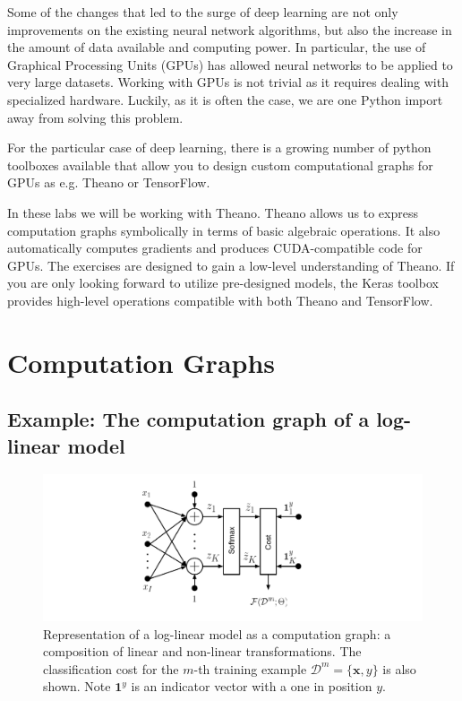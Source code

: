 Some of the changes that led to the surge of deep learning are not only
improvements on the existing neural network algorithms, but also
the increase in the amount of data available and computing power. In
particular, the use of Graphical Processing Units (GPUs) has allowed neural
networks to be applied to very large datasets. Working with GPUs is not trivial
as it requires dealing with specialized hardware. Luckily, as it is often the
case, we are one Python import away from solving this problem. 

For the particular case of deep learning, there is a growing number of python
toolboxes available that allow you to design custom computational graphs for
GPUs as e.g.
Theano\footnotemark{} or TensorFlow\footnotemark{}.

In these labs we will be working with Theano. Theano allows us to express
computation graphs symbolically in terms of basic algebraic operations. It also
automatically computes gradients and produces CUDA-compatible code for GPUs. The
exercises are designed to gain a low-level understanding of Theano. If you are
only looking forward to utilize pre-designed models, the Keras
toolbox\footnotemark{} provides high-level
operations compatible with both Theano and TensorFlow. 

\section{Computation Graphs} 

\subsection{Example: The computation graph of a log-linear model}

\begin{figure}[!h]
\centering
\includegraphics[scale=0.6]{figs/deep_learning/LogLin.pdf}
\caption{Representation of a log-linear model as a computation graph: a
composition of linear and non-linear transformations. The classification cost
for the $m$-th training example $\mathcal{D}^m=\{\mathbf{x}, y\}$ is also
shown. Note $\mathbf{1}^y$ is an indicator vector with a one in position $y$.} 
\label{fig:LogLinear}
\end{figure}

